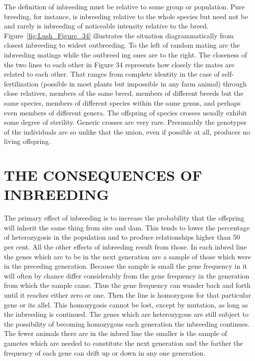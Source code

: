 The definition of inbreeding must be relative to some group or
population. Pure breeding, for instance, is inbreeding relative to the
whole species but need not be and rarely is inbreeding of noticeable
intensity relative to the breed. Figure~\ref{fig:Lush_Figure_34} illustrates
the situation diagrammatically from closest inbreeding to widest outbreeding. To the
left of random mating are the inbreeding matings while the outbreed ing
ones are to the right. The closeness of the two lines to each other in
Figure 34 represents how closely the mates are related to each other.
That ranges from complete identity in the case of self-fertilization (possible
in most plants but impossible in any farm animal) through close
relatives, members of the same breed, members of different breeds but
the same species, members of different species within the same genus,
and perhaps even members of different genera. The offspring of species
crosses usually exhibit some degree of sterility. Generic crosses are very
rare. Presumably the genotypes of the individuals are so unlike that
the union, even if possible at all, produces no living offspring.

\section*{THE CONSEQUENCES OF INBREEDING}

The primary effect of inbreeding is to increase the probability that
the offspring will inherit the same thing from sire and dam. This tends
to lower the percentage of heterozygosis in the population and to produce
relationships higher than 50 per cent. All the other effects of
inbreeding result from those. In each inbred line the genes which are to
be in the next generation are a sample of those which were in the preceding
generation. Because the sample is small the gene frequency in it
will often by chance differ considerably from the gene frequency in the
generation from which the sample came. Thus the gene frequency can
wander back and forth until it reaches either zero or one. Then the line
is homozygous for that particular gene or its allel. This homozygosis
cannot be lost, except by mutation, as long as the inbreeding is continued.
The genes which are heterozygous are still subject to the
possibility of becoming homozygous each generation the inbreeding
continues. The fewer animals there are in the inbred line the smaller
is the sample of gametes which are needed to constitute the next generation
and the farther the frequency of each gene can drift up or down
in any one generation.

